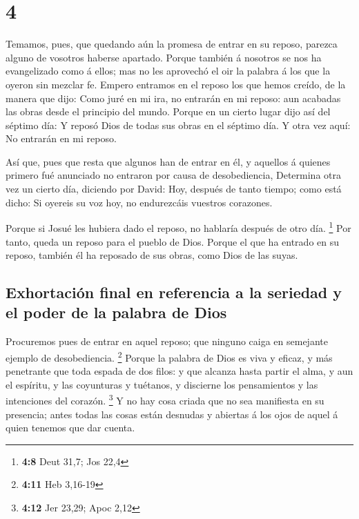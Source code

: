 \hypertarget{section-3}{%
\section{4}\label{section-3}}

 Temamos, pues, que quedando aún la promesa de entrar en su
reposo, parezca alguno de vosotros haberse apartado.  Porque
también á nosotros se nos ha evangelizado como á ellos; mas no les
aprovechó el oir la palabra á los que la oyeron sin mezclar fe.
 Empero entramos en el reposo los que hemos creído, de la
manera que dijo: Como juré en mi ira, no entrarán en mi reposo: aun
acabadas las obras desde el principio del mundo.  Porque en
un cierto lugar dijo así del séptimo día: Y reposó Dios de todas sus
obras en el séptimo día.  Y otra vez aquí: No entrarán en mi
reposo.

 Así que, pues que resta que algunos han de entrar en él, y
aquellos á quienes primero fué anunciado no entraron por causa de
desobediencia,  Determina otra vez un cierto día, diciendo
por David: Hoy, después de tanto tiempo; como está dicho: Si oyereis su
voz hoy, no endurezcáis vuestros corazones.

 Porque si Josué les hubiera dado el reposo, no hablaría
después de otro día. \footnote{\textbf{4:8} Deut 31,7; Jos 22,4}
 Por tanto, queda un reposo para el pueblo de Dios.
 Porque el que ha entrado en su reposo, también él ha
reposado de sus obras, como Dios de las suyas.

\hypertarget{exhortaciuxf3n-final-en-referencia-a-la-seriedad-y-el-poder-de-la-palabra-de-dios}{%
\subsection{Exhortación final en referencia a la seriedad y el poder de
la palabra de
Dios}\label{exhortaciuxf3n-final-en-referencia-a-la-seriedad-y-el-poder-de-la-palabra-de-dios}}

 Procuremos pues de entrar en aquel reposo; que ninguno
caiga en semejante ejemplo de desobediencia. \footnote{\textbf{4:11} Heb
  3,16-19}  Porque la palabra de Dios es viva y eficaz, y
más penetrante que toda espada de dos filos: y que alcanza hasta partir
el alma, y aun el espíritu, y las coyunturas y tuétanos, y discierne los
pensamientos y las intenciones del corazón. \footnote{\textbf{4:12} Jer
  23,29; Apoc 2,12}  Y no hay cosa criada que no sea
manifiesta en su presencia; antes todas las cosas están desnudas y
abiertas á los ojos de aquel á quien tenemos que dar cuenta.

